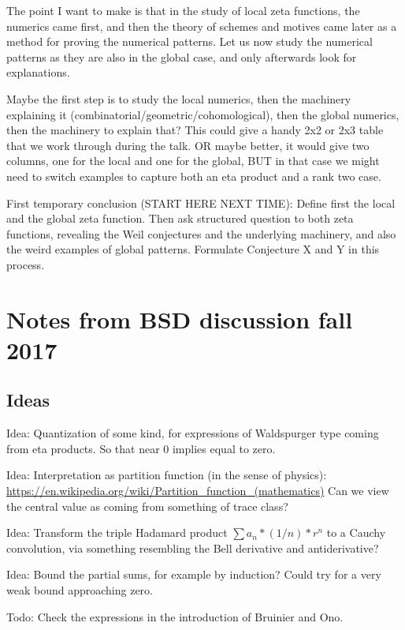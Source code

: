 \documentclass[paper=a4, fontsize=11pt]{scrartcl} %
\numberwithin{equation}{section} %
\numberwithin{figure}{section} %
\numberwithin{table}{section} %
\begin{document}
The point I want to make is that in the study of local zeta functions, the numerics came first, and then the theory of schemes and motives came later as a method for proving the numerical patterns. Let us now study the numerical patterns as they are also in the global case, and only afterwards look for explanations.

Maybe the first step is to study the local numerics, then the machinery explaining it (combinatorial/geometric/cohomological), then the global numerics, then the machinery to explain that? This could give a handy 2x2 or 2x3 table that we work through during the talk. OR maybe better, it would give two columns, one for the local and one for the global, BUT in that case we might need to switch examples to capture both an eta product and a rank two case.

First temporary conclusion (START HERE NEXT TIME): Define first the local and the global zeta function. Then ask structured question to both zeta functions, revealing the Weil conjectures and the underlying machinery, and also the weird examples of global patterns. Formulate Conjecture X and Y in this process.




\appendix

\newpage
\section{Notes from BSD discussion fall 2017}

\subsection{Ideas}

Idea: Quantization of some kind, for expressions of Waldspurger type coming from eta products. So that near 0 implies equal to zero.

Idea: Interpretation as partition function (in the sense of physics):
\url{https://en.wikipedia.org/wiki/Partition_function_(mathematics)}
Can we view the central value as coming from something of trace class?

Idea: Transform the triple Hadamard product $\sum a_n * (1/n) * r^n$ to a Cauchy convolution, via something resembling the Bell derivative and antiderivative?

Idea: Bound the partial sums, for example by induction? Could try for a very weak bound approaching zero.

Todo: Check the expressions in the introduction of Bruinier and Ono.
\end{document}
